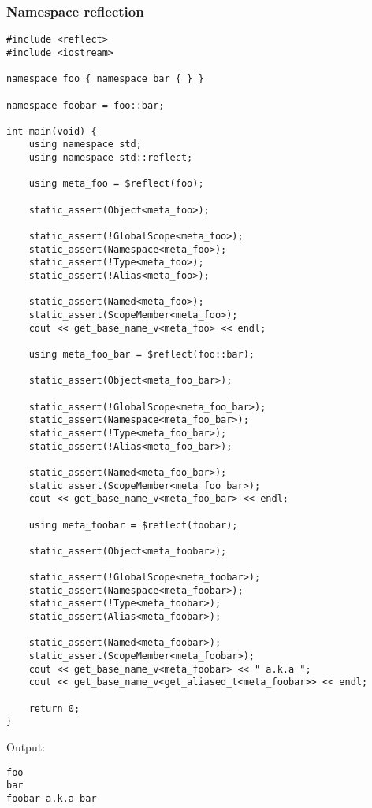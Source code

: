 \subsubsection{Namespace reflection}

\begin{verbatim}
#include <reflect>
#include <iostream>

namespace foo { namespace bar { } }

namespace foobar = foo::bar;

int main(void) {
	using namespace std;
	using namespace std::reflect;

	using meta_foo = $reflect(foo);

	static_assert(Object<meta_foo>);

	static_assert(!GlobalScope<meta_foo>);
	static_assert(Namespace<meta_foo>);
	static_assert(!Type<meta_foo>);
	static_assert(!Alias<meta_foo>);

	static_assert(Named<meta_foo>);
	static_assert(ScopeMember<meta_foo>);
	cout << get_base_name_v<meta_foo> << endl;

	using meta_foo_bar = $reflect(foo::bar);

	static_assert(Object<meta_foo_bar>);

	static_assert(!GlobalScope<meta_foo_bar>);
	static_assert(Namespace<meta_foo_bar>);
	static_assert(!Type<meta_foo_bar>);
	static_assert(!Alias<meta_foo_bar>);

	static_assert(Named<meta_foo_bar>);
	static_assert(ScopeMember<meta_foo_bar>);
	cout << get_base_name_v<meta_foo_bar> << endl;

	using meta_foobar = $reflect(foobar);

	static_assert(Object<meta_foobar>);

	static_assert(!GlobalScope<meta_foobar>);
	static_assert(Namespace<meta_foobar>);
	static_assert(!Type<meta_foobar>);
	static_assert(Alias<meta_foobar>);

	static_assert(Named<meta_foobar>);
	static_assert(ScopeMember<meta_foobar>);
	cout << get_base_name_v<meta_foobar> << " a.k.a ";
	cout << get_base_name_v<get_aliased_t<meta_foobar>> << endl;

	return 0;
}
\end{verbatim}

Output:

\begin{verbatim}
foo
bar
foobar a.k.a bar
\end{verbatim}

